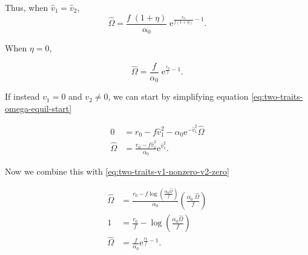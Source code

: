 Thus, when $\hat{v}_1 = \hat{v}_2$,
$$
\hat{\Omega} = \frac{ f \; ( 1 + \eta ) }{ \alpha_0 } \;
        \textrm{e}^{\frac{ r_0 }{ f ( 1 + \eta ) } - 1 }
    \textrm{.}
$$


\noindent When $\eta = 0$,

$$
    \hat{\Omega} = \frac{ f }{ \alpha_0 } \; \textrm{e}^{\frac{ r_0 }{ f } - 1 }
    \textrm{.}
$$



If instead $v_1 = 0$ and $v_2 \ne 0$, we can start by simplifying equation
\ref{eq:two-traits-omega-equil-start}

\begin{equation*}
\begin{split}
    0 &= r_0 - f \hat{v}_{1}^2 -
        \alpha_0 \textrm{e}^{ - \hat{v}_{1}^2 } \hat{\Omega} \\
    \hat{\Omega} &= \frac{ r_0 - f \hat{v}_{1}^2 }{ \alpha_0 } \textrm{e}^{ \hat{v}_{1}^2 }
    \textrm{.}
\end{split}
\end{equation*}

Now we combine this with \ref{eq:two-traits-v1-nonzero-v2-zero}

\begin{equation*}
\begin{split}
    \hat{\Omega} &= \frac{ r_0 - f \log \left( \frac{\alpha_0 \hat{\Omega}}{f} \right) }{
        \alpha_0 } \left( \frac{\alpha_0 \; \hat{\Omega}}{f} \right) \\
    1 &= \frac{ r_0 }{ f } - \log \left( \frac{\alpha_0 \hat{\Omega}}{f} \right) \\
    \hat{\Omega} &= \frac{f}{\alpha_0} \textrm{e}^{\frac{r_0}{f} - 1}
    \textrm{.}
\end{split}
\end{equation*}



















